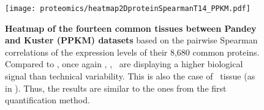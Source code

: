\begin{figure}[!htpb]
    \texttt{[image: proteomics/heatmap2DproteinSpearmanT14\_PPKM.pdf]}\centering
    \caption[Heatmap of the 14 common tissues between Pandey and Kuster
    (Spearman correlation --- PPKM)]{\label{fig:heatmap3DProtT14PPKM}\textbf{Heatmap
    of the fourteen common tissues between Pandey and Kuster (PPKM) datasets}
    based on the pairwise Spearman correlations of the expression levels of
    their 8,680 common proteins.
    Compared to ,
    once again \Placenta, \Lung, \Kidney\ are displaying a higher biological signal
    than technical variability.
    This is also the case of \Adrenal\ tissue (as in ).
    Thus, the results are similar to the ones from the first quantification method.}
\end{figure}
